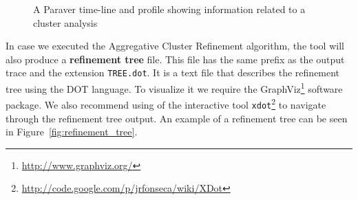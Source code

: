 \documentclass[a4paper, 12pt]{article}
\begin{document}
\begin{figure}
  \centering
  
  
  \caption{A Paraver time-line and profile showing information related
  to a cluster analysis}
  \label{fig:paraver_clustering}
\end{figure}

In case we executed the Aggregative Cluster Refinement algorithm, the tool
will also produce a \textbf{refinement tree} file. This file has the same 
prefix as the output trace and the extension \texttt{TREE.dot}. It is a
text file that describes the refinement tree using the DOT language. To
visualize it we require the GraphViz\footnote{\url{http://www.graphviz.org/}}
software package. We also recommend using of the interactive tool 
\texttt{xdot}\footnote{\url{http://code.google.com/p/jrfonseca/wiki/XDot}}
to navigate through the refinement tree output. An example of a refinement
tree can be seen in Figure~\ref{fig:refinement_tree}.
\end{document}
